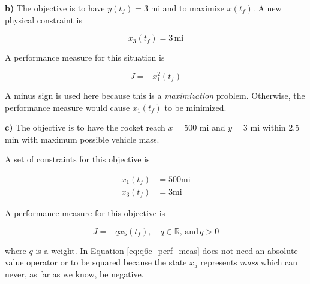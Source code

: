 \noindent \textbf{b)}
The objective is to have $y(t_f) = 3$ mi and to maximize $x(t_f)$. A new 
physical constraint is

\begin{equation}
  x_3(t_f) = 3 \, \text{mi}
\end{equation}

A performance measure for this situation is

\begin{equation}
  J = -x_1^2(t_f)
\end{equation}

\noindent A minus sign is used here because this is a \textit{maximization}
problem. Otherwise, the performance measure would cause $x_1(t_f)$ to be 
minimized.

\noindent \textbf{c)} 
The objective is to have the rocket reach $x = 500$ mi and $y = 3$ mi within
2.5 min with maximum possible vehicle mass.

A set of constraints for this objective is

\begin{align}
  x_1(t_f) &= 500 \text{mi} \\
  x_3(t_f) &= 3 \text{mi}
\end{align}

A performance measure for this objective is

\begin{equation} \label{eq:q6c_perf_meas}
  J = - q x_5(t_f), \quad q \in \mathbb{R}, \, \text{and} \, q > 0
\end{equation}

\noindent where $q$ is a weight. In Equation \ref{eq:q6c_perf_meas} does not
need an absolute value operator or to be squared because the state $x_5$ 
represents \textit{mass} which can never, as far as we know, be negative.

